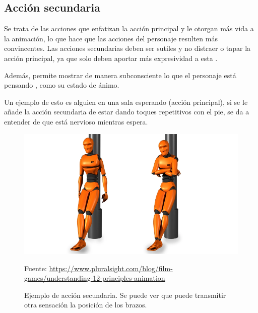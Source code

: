 \documentclass{article}
\begin{document}
\subsection{Acción secundaria}


Se trata de las acciones que enfatizan la acción principal y le otorgan más vida a la animación, lo que hace que las acciones del personaje resulten más convincentes. Las acciones secundarias deben ser sutiles y no distraer o tapar la acción principal, ya que solo deben aportar más expresividad a esta \cite{plural}.

\bigskip

Además, permite mostrar de manera subconsciente lo que el personaje está pensando \cite{idearocket}, como su estado de ánimo.

\bigskip


Un ejemplo de esto es alguien en una sala esperando (acción principal), si se le añade la acción secundaria de estar dando toques repetitivos con el pie, se da a entender de que está nervioso mientras espera.

\begin{figure}[H]
    \centering
    \includegraphics[width=\textwidth]{imagenes/secondary-action.png}
    \caption{Ejemplo de acción secundaria. Se puede ver que puede transmitir otra sensación la posición de los brazos.}
    \vspace{10pt}
    \footnotesize{Fuente: \url{https://www.pluralsight.com/blog/film-games/understanding-12-principles-animation}}
\end{figure}
\end{document}
